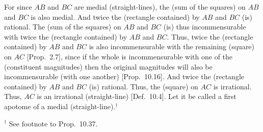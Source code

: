 \begin{Parallel}{}{}
{For since $AB$ and $BC$ are medial (straight-lines), the (sum of the squares)
on $AB$ and $BC$ is also medial. And twice the (rectangle contained)
by $AB$ and $BC$ (is) rational. The (sum of the squares) on $AB$
and $BC$ (is) thus incommensurable with twice the (rectangle contained)
by $AB$ and $BC$. Thus, twice the (rectangle contained) by
$AB$ and $BC$ is also incommensurable with the remaining (square) on $AC$ [Prop.~2.7], since  if the whole is
incommensurable with one of the (constituent magnitudes)   then the original magnitudes will also be incommensurable (with one another) [Prop.~10.16]. And twice the (rectangle
contained) by $AB$ and $BC$ (is) rational. Thus, the (square) on $AC$
is irrational. Thus, $AC$ is an irrational (straight-line) [Def.~10.4]. Let it be called a first apotome
of a medial (straight-line).$^\dag$}
\end{Parallel}
{\footnotesize\noindent $^\dag$ See footnote to Prop.~10.37.} 

